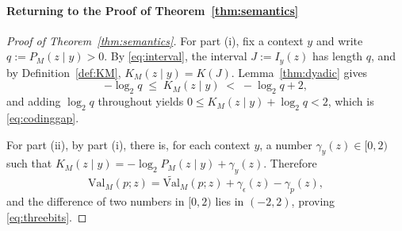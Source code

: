 \documentclass[letterpaper]{article} %
\theoremstyle{definition}
\theoremstyle{remark}
\newcommand{\Val}{\mathrm{Val}}
\newcommand{\eps}{\epsilon}
\begin{document}
\paragraph{Returning to the Proof of Theorem~\ref{thm:semantics}}
\begin{proof}[Proof of Theorem~\ref{thm:semantics}]
For part (i), fix a context $y$ and write $q := P_M(z \mid y) > 0$. By
\eqref{eq:interval}, the interval $J := I_y(z)$ has length $q$, and by
Definition~\ref{def:KM}, $K_M(z \mid y) = K(J)$. Lemma~\ref{thm:dyadic} gives
\[
-\log_2 q \;\le\; K_M(z \mid y) \;<\; -\log_2 q + 2,
\]
and adding $\log_2 q$ throughout yields
$0 \le K_M(z \mid y) + \log_2 q < 2$, which is \eqref{eq:codinggap}. 

For part (ii), by part (i),  there is, for each context $y$, a number
$\gamma_y(z) \in [0,2)$ such that
$K_M(z \mid y) = -\log_2 P_M(z \mid y) + \gamma_y(z)$. Therefore
\[
\Val_M(p;z) = \widetilde{\Val}_M(p;z) + \gamma_\eps(z) - \gamma_p(z),
\]
and the difference of two numbers in $[0,2)$ lies in $(-2,2)$, proving
\eqref{eq:threebits}.
\end{proof}
\end{document}
